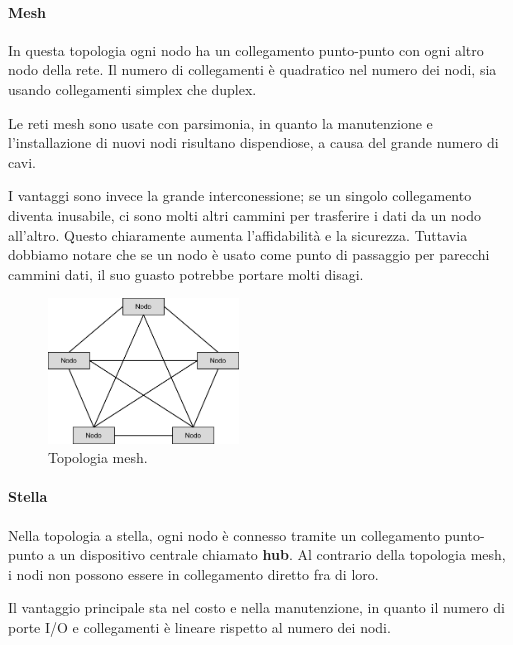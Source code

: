             \paragraph{Mesh} In questa topologia ogni nodo ha un collegamento punto-punto con ogni altro nodo della rete. Il numero di collegamenti è quadratico nel numero dei nodi, sia usando collegamenti simplex che duplex.
            
            Le reti mesh sono usate con parsimonia, in quanto la manutenzione e l'installazione di nuovi nodi risultano dispendiose, a causa del grande numero di cavi.
            
            I vantaggi sono invece la grande interconessione; se un singolo collegamento diventa inusabile, ci sono molti altri cammini per trasferire i dati da un nodo all'altro. Questo chiaramente aumenta l'affidabilità e la sicurezza. Tuttavia dobbiamo notare che se un nodo è usato come punto di passaggio per parecchi cammini dati, il suo guasto potrebbe portare molti disagi.
            
            \begin{figure}[h]
                \centering
                \includegraphics[width=0.45\textwidth]{img/mesh.png}
                \caption{Topologia mesh.}
                \label{fig:img1}
            \end{figure}
            
            \paragraph{Stella} Nella topologia a stella, ogni nodo è connesso tramite un collegamento punto-punto a un dispositivo centrale chiamato \textbf{hub}. Al contrario della topologia mesh, i nodi non possono essere in collegamento diretto fra di loro.
            
            Il vantaggio principale sta nel costo e nella manutenzione, in quanto il numero di porte I/O e collegamenti è lineare rispetto al numero dei nodi.
            
